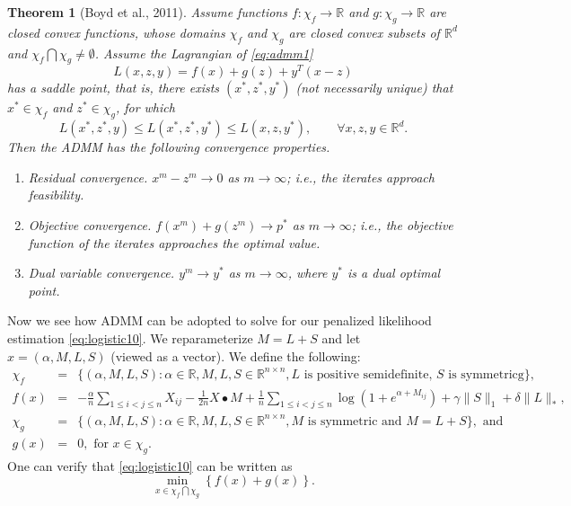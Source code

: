 \documentclass{article}
\newtheorem{theorem}{Theorem}[section]
\begin{document}
\begin{theorem}[Boyd et al., 2011]
Assume functions $f: \chi_f \to \mathbb{R}$ and
$g: \chi_g \to \mathbb{R}$ are
closed convex functions, whose domains $\chi_f$ and $\chi_g$
are closed convex subsets of $\mathbb{R}^d$ and
$\chi_f \bigcap \chi_g \neq \emptyset$.
Assume the Lagrangian of \eqref{eq:admm1}
$$
L(x,z,y) = f(x) + g(z) + y^T(x-z)
$$
has a saddle point, that is, there exists $(x^\ast, z^\ast, y^\ast)$ (not necessarily unique) that $x^\ast \in \chi_f$ and
$z^\ast \in \chi_g$, for which
$$
L(x^\ast, z^\ast, y) \le L(x^\ast, z^\ast, y^\ast) \le
L(x, z, y^\ast), \qquad \forall x, z, y \in \mathbb{R}^d.
$$
Then the ADMM has the following convergence properties.
\begin{enumerate}
\item Residual convergence. $x^m - z^m \to 0$
as $m \to \infty$; i.e., the iterates approach feasibility.

\item Objective convergence. $f(x^m) + g(z^m) \to p^\ast$ as $m \to \infty$; i.e., the objective function of
the iterates approaches the optimal value.

\item Dual variable convergence. $y^m \to y^\ast$ as $m \to \infty$, where $y^\ast$ is a dual optimal point.

\end{enumerate}
\end{theorem}


Now we see how ADMM can be adopted to solve for our penalized likelihood estimation \eqref{eq:logistic10}.
We reparameterize $M = L + S$ and let $x = (\alpha, M, L, S)$ (viewed as a vector).
We define the following:
\begin{eqnarray*}
\chi_f &=& \{ (\alpha, M, L, S): \alpha\in\mathbb{R}, M, L, S \in \mathbb{R}^{n \times n},
L \mbox{ is positive semidefinite, }
S \mbox{ is symmetricg} \}, \\
f(x) &=&
-\frac{\alpha}{n} \sum_{1\le i< j\le n}X_{ij}
-\frac{1}{2n} X \bullet M %
+ \frac{1}{n}
\sum_{1\le i<j\le n} \log \left(1 + e^{\alpha + M_{ij}}\right)
+ \gamma \|S\|_1
+ \delta \|L\|_\ast, \\
\chi_g &=& \{ (\alpha, M, L, S): \alpha\in\mathbb{R}, M, L, S \in \mathbb{R}^{n \times n},
M \mbox{ is symmetric and } M=L+S \}, \mbox{ and }\\
g(x) &=& 0, \mbox{ for } x \in \chi_g.
\end{eqnarray*}
One can verify that \eqref{eq:logistic10} can be written as
$$
\min_{x \in \chi_f \bigcap \chi_g} \left\{f(x) + g(x) \right\}.
$$
\end{document}
